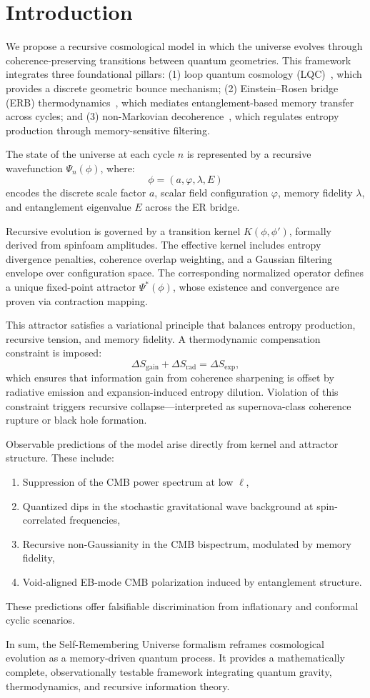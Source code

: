 \section{Introduction}
\label{sec:Intro}

We propose a recursive cosmological model in which the universe evolves through coherence-preserving transitions between quantum geometries. This framework integrates three foundational pillars: (1) loop quantum cosmology (LQC)~\cite{ashtekar2006quantum}, which provides a discrete geometric bounce mechanism; (2) Einstein–Rosen bridge (ERB) thermodynamics~\cite{maldacena2013cool}, which mediates entanglement-based memory transfer across cycles; and (3) non-Markovian decoherence~\cite{breuer2002theory}, which regulates entropy production through memory-sensitive filtering.

The state of the universe at each cycle \( n \) is represented by a recursive wavefunction \( \Psi_n(\phi) \), where:
\[
\phi = (a, \varphi, \lambda, E)
\]
encodes the discrete scale factor \( a \), scalar field configuration \( \varphi \), memory fidelity \( \lambda \), and entanglement eigenvalue \( E \) across the ER bridge.

Recursive evolution is governed by a transition kernel \( K(\phi, \phi') \), formally derived from spinfoam amplitudes. The effective kernel includes entropy divergence penalties, coherence overlap weighting, and a Gaussian filtering envelope over configuration space. The corresponding normalized operator defines a unique fixed-point attractor \( \Psi^*(\phi) \), whose existence and convergence are proven via contraction mapping.

This attractor satisfies a variational principle that balances entropy production, recursive tension, and memory fidelity. A thermodynamic compensation constraint is imposed:
\[
\Delta S_{\text{gain}} + \Delta S_{\text{rad}} = \Delta S_{\text{exp}},
\]
which ensures that information gain from coherence sharpening is offset by radiative emission and expansion-induced entropy dilution. Violation of this constraint triggers recursive collapse—interpreted as supernova-class coherence rupture or black hole formation.

Observable predictions of the model arise directly from kernel and attractor structure. These include:
\begin{enumerate}
    \item Suppression of the CMB power spectrum at low \( \ell \),
    \item Quantized dips in the stochastic gravitational wave background at spin-correlated frequencies,
    \item Recursive non-Gaussianity in the CMB bispectrum, modulated by memory fidelity,
    \item Void-aligned EB-mode CMB polarization induced by entanglement structure.
\end{enumerate}
These predictions offer falsifiable discrimination from inflationary and conformal cyclic scenarios.

In sum, the Self-Remembering Universe formalism reframes cosmological evolution as a memory-driven quantum process. It provides a mathematically complete, observationally testable framework integrating quantum gravity, thermodynamics, and recursive information theory.
